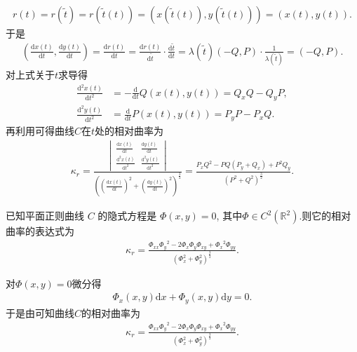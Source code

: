 \documentclass[../../main.tex]{subfiles}%
\begin{document}
\begin{solution}
\begin{align*}
r(t)=r(\tilde{t})=r(\tilde{t}(t))=(x(\tilde{t}(t)),y(\tilde{t}(t)))=(x(t),y(t)).
\end{align*}
于是
\begin{align*}
\left(\frac{\mathrm{d}x(t)}{\mathrm{d}t},\frac{\mathrm{d}y(t)}{\mathrm{d}t}\right)=\frac{\mathrm{d}r(t)}{\mathrm{d}t}=\frac{\mathrm{d}r(t)}{\mathrm{d}\tilde{t}}\cdot \frac{\mathrm{d}\tilde{t}}{\mathrm{d}t}=\lambda(\tilde{t})(-Q,P)\cdot \frac{1}{\lambda(\tilde{t})}=(-Q,P).
\end{align*}
对上式关于$t$求导得
\begin{align*}
\frac{\mathrm{d}^2x(t)}{\mathrm{d}t^2}&=-\frac{\mathrm{d}}{\mathrm{d}t}Q(x(t),y(t))=Q_xQ-Q_yP,\\
\frac{\mathrm{d}^2y(t)}{\mathrm{d}t^2}&=\frac{\mathrm{d}}{\mathrm{d}t}P(x(t),y(t))=P_yP-P_xQ.
\end{align*}
再利用可得曲线$C$在$t$处的相对曲率为
\begin{align*}
\kappa_r=\frac{\begin{vmatrix}
\frac{\mathrm{d}x(t)}{\mathrm{d}t}&\frac{\mathrm{d}y(t)}{\mathrm{d}t}\\
\frac{\mathrm{d}^2x(t)}{\mathrm{d}t^2}&\frac{\mathrm{d}^2y(t)}{\mathrm{d}t^2}
\end{vmatrix}}{\left(\left(\frac{\mathrm{d}x(t)}{\mathrm{d}t}\right)^2+\left(\frac{\mathrm{d}y(t)}{\mathrm{d}t}\right)^2\right)^{\frac{3}{2}}}=\frac{P_xQ^2-PQ(P_y+Q_x)+P^2Q_y}{(P^2+Q^2)^{\frac{3}{2}}}.
\end{align*}

\end{solution}

\begin{corollary}
已知平面正则曲线 $C$ 的隐式方程是 $\Phi(x,y)=0$, 其中$\Phi\in C^2(\mathbb{R}^2)$.则它的相对曲率的表达式为
\begin{align*}
\kappa _r=\frac{\Phi _{xx}{\Phi _y}^2-2\Phi _x\Phi _y\Phi _{xy}+{\Phi _x}^2\Phi _{yy}}{\left( \Phi _{x}^{2}+\Phi _{y}^{2} \right) ^{\frac{3}{2}}}.
\end{align*}
\end{corollary}
\begin{solution}
对$\Phi(x,y)=0$微分得
\begin{align*}
\Phi _x\left( x,y \right) \mathrm{d}x+\Phi _y\left( x,y \right) \mathrm{d}y=0.
\end{align*}
于是由可知曲线$C$的相对曲率为
\begin{align*}
\kappa _r=\frac{\Phi _{xx}{\Phi _y}^2-2\Phi _x\Phi _y\Phi _{xy}+{\Phi _x}^2\Phi _{yy}}{\left( \Phi _{x}^{2}+\Phi _{y}^{2} \right) ^{\frac{3}{2}}}.
\end{align*}

\end{solution}
\end{document}

